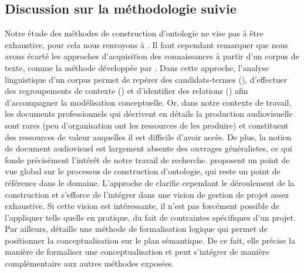 





\subsection*{Discussion sur la méthodologie suivie}



Notre étude des méthodes de construction d'ontologie ne vise pas à être exhaustive, pour cela nous renvoyons à \cite{Gomez-Perez2004}.
Il faut cependant remarquer que nous avons écarté les approches d'acquisition des connaissances à partir d'un corpus de texte, comme la méthode  développée par \cite{Aussenac-Gilles2003}.
Dans cette approche, l'analyse linguistique d'un corpus permet de repérer des candidats-termes (), d'effectuer des regroupements de contexte () et d'identifier des relations () afin d'accompagner la modélisation conceptuelle.
Or, dans notre contexte de travail, les documents professionnels qui décrivent en détails la production audiovisuelle sont rares (peu d'organisation ont les ressources de les produire) et constituent des ressources de valeur auquelles il est difficile d'avoir accès. 
De plus, la notion de document audiovisuel est largement absente des ouvrages généralistes, ce qui fonde précisément l'intérêt de notre travail de recherche.
\citeauthor{Uschold1996} proposent un point de vue global sur le processus de construction d'ontologie, qui reste un point de référence dans le domaine.
L'approche de  clarifie cependant le déroulement de la construction et s'efforce de l'intégrer dans une vision de gestion de projet assez exhaustive. 
Si cette vision est intéressante, il n'est pas forcément possible de l'appliquer telle quelle en pratique, du fait de contraintes spécifiques d'un projet.
Par ailleurs,  détaille une méthode de formalisation logique qui permet de positionner la conceptualisation sur le plan sémantique. 
De ce fait, elle précise la manière de formaliser une conceptualisation et peut s'intégrer de manière complémentaire aux autres méthodes exposées.

